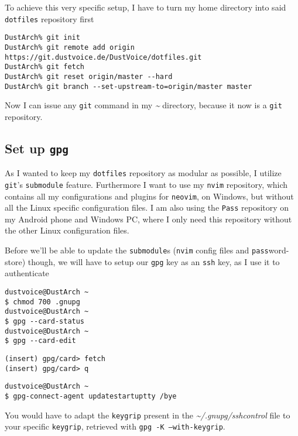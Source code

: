 \documentclass[10pt]{dustdoc}
\begin{document}
To achieve this very specific setup, I have to turn my home directory into said \texttt{dotfiles} repository first

\begin{verbatim}
DustArch% git init
DustArch% git remote add origin https://git.dustvoice.de/DustVoice/dotfiles.git
DustArch% git fetch
DustArch% git reset origin/master --hard
DustArch% git branch --set-upstream-to=origin/master master
\end{verbatim}

Now I can issue any \texttt{git} command in my \textit{\~{}} directory, because it now is a \texttt{git} repository.

\subsection{Set up \texttt{gpg}}
\label{sec:set-up-gpg}

As I wanted to keep my \texttt{dotfiles} repository as modular as possible, I utilize \texttt{git}'s \texttt{submodule} feature.
Furthermore I want to use my \texttt{nvim} repository, which contains all my configurations and plugins for \texttt{neovim}, on Windows, but without all the Linux specific configuration files.
I am also using the \texttt{Pass} repository on my Android phone and Windows PC, where I only need this repository without the other Linux configuration files.

Before we’ll be able to update the \texttt{submodule}s (\texttt{nvim} config files and \texttt{pass}word-store) though, we will have to setup our \texttt{gpg} key as an \texttt{ssh} key, as I use it to authenticate

\begin{verbatim}
dustvoice@DustArch ~
$ chmod 700 .gnupg
dustvoice@DustArch ~
$ gpg --card-status
dustvoice@DustArch ~
$ gpg --card-edit
\end{verbatim}

\begin{verbatim}
(insert) gpg/card> fetch
(insert) gpg/card> q
\end{verbatim}

\begin{verbatim}
dustvoice@DustArch ~
$ gpg-connect-agent updatestartuptty /bye
\end{verbatim}

\begin{NOTE}
    You would have to adapt the \texttt{keygrip} present in the \textit{\~{}/.gnupg/sshcontrol} file to your specific \texttt{keygrip}, retrieved with \texttt{gpg -K --with-keygrip}.
\end{NOTE}
\end{document}
